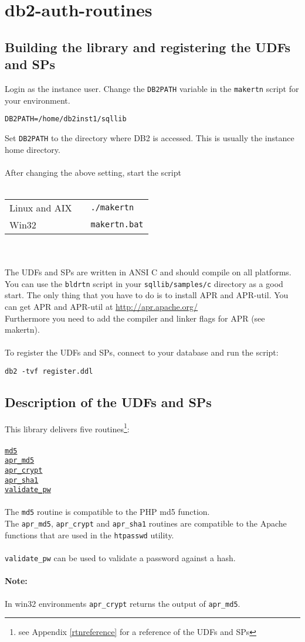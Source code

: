 \section{db2-auth-routines}
\subsection{Building the library and registering the UDFs and SPs}
Login as the instance user. Change the {\tt DB2PATH} variable in the {\tt makertn} script for your environment.
\begin{verbatim}
DB2PATH=/home/db2inst1/sqllib
\end{verbatim}
Set {\tt DB2PATH} to the directory where DB2 is accessed. This is usually the instance home directory.\\
\\
After changing the above setting, start the script\\
\\
\begin{tabular}{@{} lll @{}}
Linux and AIX & & {\tt ./makertn}\\
Win32         & & {\tt makertn.bat}\\
\end{tabular}
\\\\
The UDFs and SPs are written in ANSI C and should compile on all platforms.
You can use the {\tt bldrtn} script in your {\tt sqllib/samples/c} directory as a good start.
The only thing that you have to do is to install APR and \mbox{APR-util}.
You can get APR and APR-util at \url{http://apr.apache.org/} \\
Furthermore you need to add the compiler and linker flags for APR (see makertn).\\
\\
To register the UDFs and SPs, connect to your database and run the script:
\begin{verbatim}
db2 -tvf register.ddl
\end{verbatim}
\newpage
\subsection{Description of the UDFs and SPs}
This library delivers five routines\footnote{see Appendix \ref{rtnreference} for a reference of the UDFs and SPs}:\\
\\
\hyperlink{hmd5}{\tt md5}\\
\hyperlink{haprmd5}{\tt apr\_md5}\\
\hyperlink{haprcrypt}{\tt apr\_crypt}\\
\hyperlink{haprsha1}{\tt apr\_sha1}\\
\hyperlink{hvalidatepw}{\tt validate\_pw}\\
\\
The {\tt md5} routine is compatible to the PHP md5 function.\\
The {\tt apr\_md5}, {\tt apr\_crypt} and {\tt apr\_sha1} routines are compatible to the Apache functions that are used in the {\tt htpasswd} utility.\\
\\
{\tt validate\_pw} can be used to validate a password against a hash.
\paragraph{Note:}{In win32 environments {\tt apr\_crypt} returns the output of {\tt apr\_md5}.}